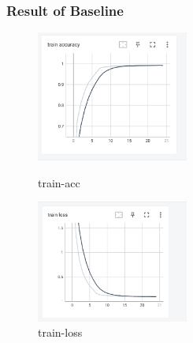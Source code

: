 \documentclass{beamer}
\begin{document}
        \begin{frame}
            \frametitle{Result of Baseline}
            \begin{figure}[H]
                \centering
                \begin{minipage}[t]{0.48\textwidth}
                \centering
                \includegraphics[width=5cm]{./img/train_acc.png}
                \caption{train-acc}
                \end{minipage}
                \begin{minipage}[t]{0.48\textwidth}
                \centering
                \includegraphics[width=5cm]{./img/train_loss.png}
                \caption{train-loss}
                \end{minipage}
            \end{figure}\par
        \end{frame}
\end{document}
